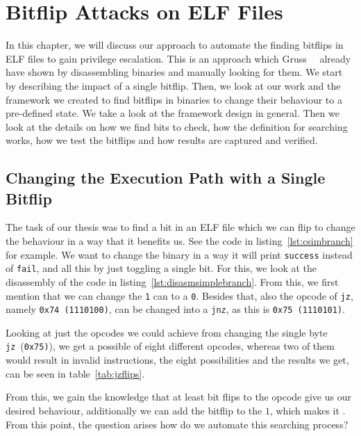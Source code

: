\chapter{Bitflip Attacks on ELF Files}\label{sec:bitflip}

In this chapter, we will discuss our approach to automate the finding bitflips
in ELF files to gain privilege escalation. This is an approach which
Gruss~\etal~\cite{flipinthewall} already have shown by disassembling binaries
and manually looking for them. We start by describing the impact of a single
bitflip. Then, we look at our work and the framework we created to find bitflips
in binaries to change their behaviour to a pre-defined state. We take a look at
the framework design in general. Then we look at the details on how we find bits
to check, how the definition for searching works, how we test the bitflips and
how results are captured and verified.

\section{Changing the Execution Path with a Single Bitflip}

The task of our thesis was to find a bit in an ELF file which we can flip to
change the behaviour in a way that it benefits us. See the code in
listing~\ref{lst:csimbranch} for example. We want to change the binary in a way
it will print \texttt{success} instead of \texttt{fail}, and all this by just
toggling a single bit. For this, we look at the disassembly of the code in
listing~\ref{lst:disasmsimplebranch}. From this, we first mention that we can
change the \texttt{1} can to a \texttt{0}. Besides that, also the opcode of
\texttt{jz}, namely \texttt{0x74 (1110100)}, can be changed into a
\texttt{jnz}, as this is \texttt{0x75 (1110101)}.

Looking at just the opcodes we could achieve from changing the single byte
\texttt{jz}~(\texttt{0x75)}), we get a possible of eight different opcodes,
whereas two of them would result in invalid instructions, the eight
possibilities and the results we get, can be seen in table~\ref{tab:jzflips}.

From this, we gain the knowledge that at least  bit flips to the opcode give us our desired behaviour,
additionally we can add the bitflip to the $1$, which makes it . From this point, the question arises how do we automate this
searching process?

